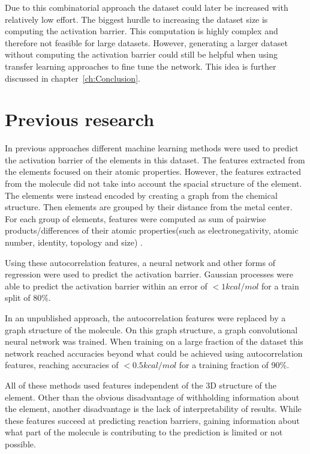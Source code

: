 Due to this combinatorial approach the dataset could later be increased with relatively low effort.
The biggest hurdle to increasing the dataset size is computing the activation barrier.
This computation is highly complex and therefore not feasible for large datasets.
However, generating a larger dataset without computing the activation barrier could still be helpful when using transfer learning approaches to fine tune the network.
This idea is further discussed in chapter~\ref{ch:Conclusion}.


\section{Previous research}

In previous approaches different machine learning methods were used to predict the activation barrier of the elements in this dataset.
The features extracted from the elements focused on their atomic properties.
However, the features extracted from the molecule did not take into account the spacial structure of the element.
The elements were instead encoded by creating a graph from the chemical structure.
Then elements are grouped by their distance from the metal center.
For each group of elements, features were computed as sum of pairwise products/differences of their atomic properties(such as electronegativity, atomic number, identity, topology and size) \cite{friederich_dos}.


Using these autocorrelation features, a neural network and other forms of regression were used to predict the activation barrier.
Gaussian processes were able to predict the activation barrier within an error of $<1 kcal/mol$ for a train split of $80\%$.

In an unpublished approach, the autocorrelation features were replaced by a graph structure of the molecule.
On this graph structure, a graph convolutional neural network was trained.
When training on a large fraction of the dataset this network reached accuracies 
beyond what could be achieved using autocorrelation features, reaching accuracies of $<0.5 kcal/mol$ for a training fraction of 90\%.

All of these methods used features independent of the 3D structure of the element.
Other than the obvious disadvantage of withholding information about the element, another disadvantage is the lack of interpretability of results.
While these features succeed at predicting reaction barriers, gaining 
information about what part of the molecule is contributing to the prediction is limited or not possible.

